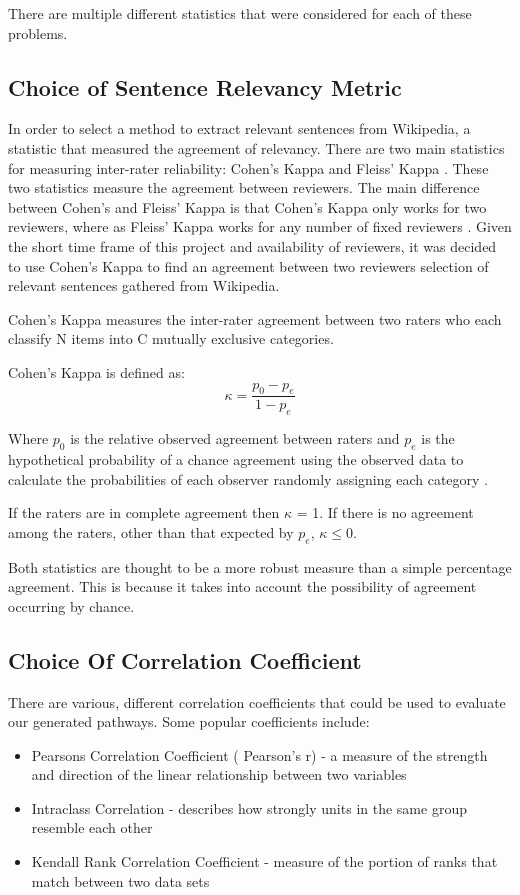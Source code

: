 \documentclass[bsc,frontabs,twoside,singlespacing,parskip,deptreport]{infthesis}     %
\begin{document}
There are multiple different statistics that were considered for each of these problems.
\subsection{Choice of Sentence Relevancy Metric}\label{sec:cohen}
In order to select a method to extract relevant sentences from Wikipedia, a statistic that measured the agreement
of relevancy. There are two main statistics for measuring inter-rater reliability: Cohen's Kappa and Fleiss' Kappa \cite{}.
These two statistics measure the agreement between reviewers. The main difference between Cohen's and Fleiss' Kappa is that
Cohen's Kappa only works for two reviewers, where as Fleiss' Kappa works for any number of fixed reviewers \cite{}.
Given the short time frame of this project and availability of reviewers, it was decided to use Cohen's Kappa
to find an agreement between two reviewers selection of relevant sentences gathered from Wikipedia.

Cohen's Kappa measures the inter-rater agreement between two raters
who each classify N items into C mutually exclusive categories.

Cohen's Kappa is defined as:\\
\begin{equation}
  \kappa = \frac{p_{0} - p_{e}}{1 - p_{e}}\nonumber
\end{equation}

Where $p_0$ is the relative observed agreement between raters and $p_e$ is the hypothetical probability
of a chance agreement using the observed data to calculate the probabilities of each observer randomly assigning each category \cite{}.

If the raters are in complete agreement then $\kappa$ = 1.
If there is no agreement among the raters, other than that expected by $p_e$, $\kappa \leq 0$.

Both statistics are thought to be a more robust measure than a simple percentage agreement.
This is because it takes into account the possibility of agreement occurring by chance.

\subsection{Choice Of Correlation Coefficient}\label{sec:kendall}

There are various, different correlation coefficients that could be used to evaluate our generated pathways.
Some popular coefficients include:
\begin{itemize}
\item Pearsons Correlation Coefficient ( Pearson's r) - a measure of the strength and direction of the linear relationship between two variables
\item Intraclass Correlation - describes how strongly units in the same group resemble each other
\item Kendall Rank Correlation Coefficient -  measure of the portion of ranks that match between two data sets
\end{itemize}
\end{document}
